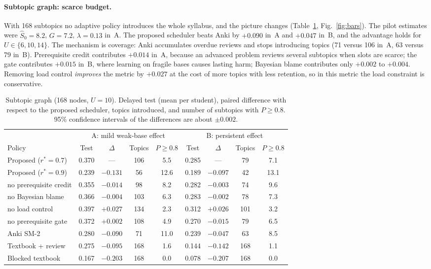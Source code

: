 \documentclass[runningheads]{llncs}
\newcommand{\Sh}{\hat S}
\newcommand{\rstar}{r^{\ast}}
\begin{document}
\paragraph{Subtopic graph: scarce budget.} With 168 subtopics no adaptive policy introduces the whole syllabus, and the picture changes (Table~\ref{tab:sub}, Fig.~\ref{fig:bars}). The pilot estimates were $\Sh_0=8.2$, $G=7.2$, $\lambda=0.13$ in~A. The proposed scheduler beats Anki by $+0.090$ in~A and $+0.047$ in~B, and the advantage holds for $U\in\{6,10,14\}$. The mechanism is coverage: Anki accumulates overdue reviews and stops introducing topics (71 versus 106 in~A, 63 versus 79 in~B). Prerequisite credit contributes $+0.014$ in~A, because an advanced problem reviews several subtopics when slots are scarce; the gate contributes $+0.015$ in~B, where learning on fragile bases causes lasting harm; Bayesian blame contributes only $+0.002$ to $+0.004$. Removing load control \emph{improves} the metric by $+0.027$ at the cost of more topics with less retention, so in this metric the load constraint is conservative.

\begin{table}[t]
\centering
\caption{Subtopic graph (168 nodes, $U=10$). Delayed test (mean per student), paired difference with respect to the proposed scheduler, topics introduced, and number of subtopics with $P\ge0.8$. 95\% confidence intervals of the differences are about $\pm0.002$.}
\label{tab:sub}
\setlength{\tabcolsep}{3.2pt}
\begin{tabular}{@{}lcccccccc@{}}
\toprule
& \multicolumn{4}{c}{A: mild weak-base effect} & \multicolumn{4}{c}{B: persistent effect} \\
\cmidrule(lr){2-5}\cmidrule(lr){6-9}
Policy & Test & $\Delta$ & Topics & $P\!\ge\!0.8$ & Test & $\Delta$ & Topics & $P\!\ge\!0.8$ \\
\midrule
Proposed ($\rstar=0.7$) & 0.370 & --- & 106 & 5.5 & 0.285 & --- & 79 & 7.1 \\
Proposed ($\rstar=0.9$) & 0.239 & $-0.131$ & 56 & 12.6 & 0.189 & $-0.097$ & 42 & 13.1 \\
\quad no prerequisite credit & 0.355 & $-0.014$ & 98 & 8.2 & 0.282 & $-0.003$ & 74 & 9.6 \\
\quad no Bayesian blame & 0.366 & $-0.004$ & 103 & 6.3 & 0.283 & $-0.002$ & 78 & 7.3 \\
\quad no load control & 0.397 & $+0.027$ & 134 & 2.3 & 0.312 & $+0.026$ & 101 & 3.2 \\
\quad no prerequisite gate & 0.372 & $+0.002$ & 108 & 4.9 & 0.270 & $-0.015$ & 79 & 6.5 \\
Anki SM-2 & 0.280 & $-0.090$ & 71 & 11.0 & 0.239 & $-0.047$ & 63 & 8.5 \\
Textbook + review & 0.275 & $-0.095$ & 168 & 1.6 & 0.144 & $-0.142$ & 168 & 1.1 \\
Blocked textbook & 0.167 & $-0.203$ & 168 & 0.0 & 0.078 & $-0.207$ & 168 & 0.0 \\
\bottomrule
\end{tabular}
\end{table}
\end{document}
